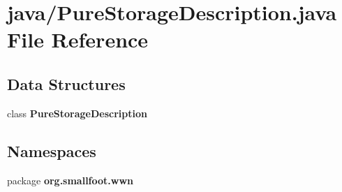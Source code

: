 \section{java/\-Pure\-Storage\-Description.java \-File \-Reference}
\label{PureStorageDescription_8java}
\subsection*{\-Data \-Structures}
\begin{DoxyCompactItemize}
\item 
class {\bf \-Pure\-Storage\-Description}
\end{DoxyCompactItemize}
\subsection*{\-Namespaces}
\begin{DoxyCompactItemize}
\item 
package {\bf org.\-smallfoot.\-wwn}
\end{DoxyCompactItemize}
